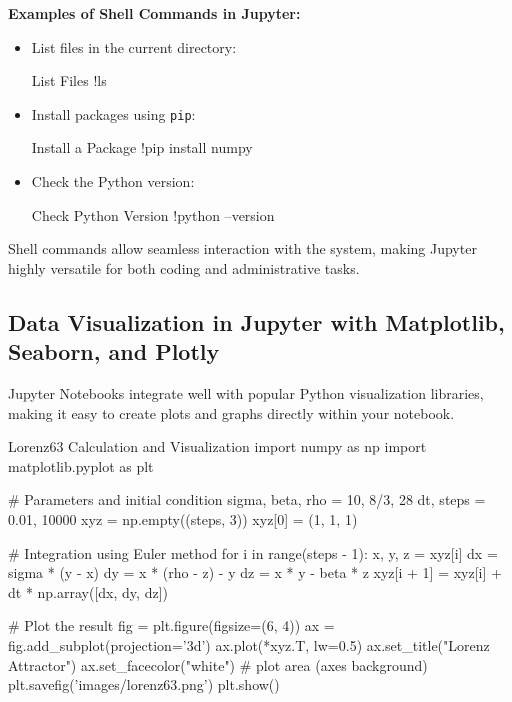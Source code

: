 \textbf{Examples of Shell Commands in Jupyter:}
\begin{itemize}
    \item List files in the current directory:
    \begin{codeonly}{List Files}
!ls
    \end{codeonly}
    \item Install packages using \texttt{pip}:
    \begin{codeonly}{Install a Package}
!pip install numpy
    \end{codeonly}
    \item Check the Python version:
    \begin{codeonly}{Check Python Version}
!python --version
    \end{codeonly}
\end{itemize}

Shell commands allow seamless interaction with the system, making Jupyter highly versatile for both coding and administrative tasks.

%
\subsection{Data Visualization in Jupyter with Matplotlib, Seaborn, and Plotly}

Jupyter Notebooks integrate well with popular Python visualization libraries, making it easy to create plots and graphs directly within your notebook.

\begin{codeonly}{Lorenz63 Calculation and Visualization}
import numpy as np
import matplotlib.pyplot as plt

# Parameters and initial condition
sigma, beta, rho = 10, 8/3, 28
dt, steps = 0.01, 10000
xyz = np.empty((steps, 3))
xyz[0] = (1, 1, 1)

# Integration using Euler method
for i in range(steps - 1):
    x, y, z = xyz[i]
    dx = sigma * (y - x)
    dy = x * (rho - z) - y
    dz = x * y - beta * z
    xyz[i + 1] = xyz[i] + dt * np.array([dx, dy, dz])

# Plot the result
fig = plt.figure(figsize=(6, 4))
ax = fig.add_subplot(projection='3d')
ax.plot(*xyz.T, lw=0.5)
ax.set_title("Lorenz Attractor")
ax.set_facecolor("white")       # plot area (axes background)
plt.savefig('images/lorenz63.png')
plt.show()
\end{codeonly}

